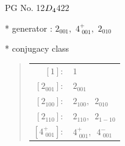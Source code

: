 \documentclass[fleqn,8pt]{jsarticle}
\begin{document}
\setcounter{MaxMatrixCols}{32}

\renewcommand{\tablename}{Table~}
\renewcommand{\figurename}{Figure~}
\begin{center}
\LARGE
PG No. 12\quad$D_{\rm 4}$\quad$422$\quad[ tetragonal ]
\end{center}

* generator : $2{}_{001},\,\,4^{+}_{\,\,001},\,\,2{}_{010}$

* conjugacy class
\begin{quote}
\begin{tabular}{rl}
$ [1]: $ & $ 1 $ \\
$ [2{}_{001}]: $ & $ 2{}_{001} $ \\
$ [2{}_{100}]: $ & $ 2{}_{100},\,\,\,2{}_{010} $ \\
$ [2{}_{110}]: $ & $ 2{}_{110},\,\,\,2{}_{1-10} $ \\
$ [4^{+}_{\,\,001}]: $ & $ 4^{+}_{\,\,001},\,\,\,4^{-}_{\,\,001} $
\end{tabular}
\end{quote}
\end{document}

